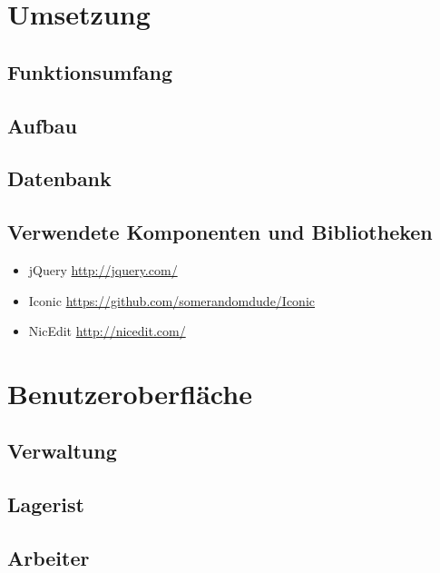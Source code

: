 \documentclass[ngerman, 12pt, pdftex]{scrartcl}[2006/07/30]
\begin{document}



\section{Umsetzung}
\subsection{Funktionsumfang}


\subsection{Aufbau}


\subsection{Datenbank}


\subsection{Verwendete Komponenten und Bibliotheken} %
\begin{itemize}
\item jQuery \url{http://jquery.com/}
\item Iconic \url{https://github.com/somerandomdude/Iconic}    
\item NicEdit \url{http://nicedit.com/}
\end{itemize}



\section{Benutzeroberfläche}
\subsection{Verwaltung}

\subsection{Lagerist}



\subsection{Arbeiter}
\end{document}
